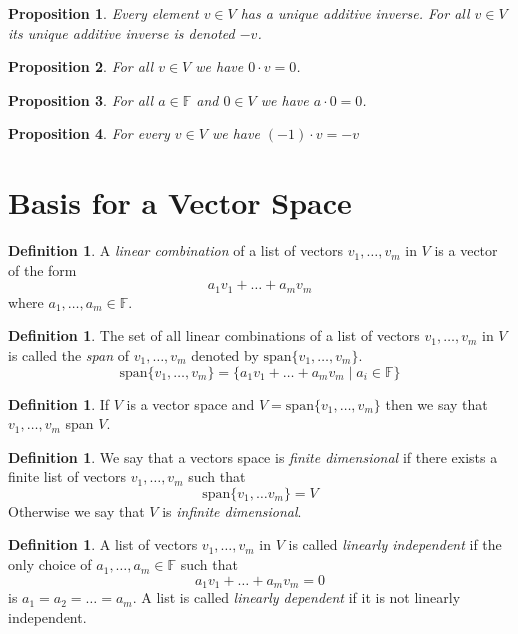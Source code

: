 \documentclass[12pt,letterpaper]{amsart}
\theoremstyle{plain}
\newtheorem{proposition}{Proposition}[section]
\theoremstyle{definition}
\newtheorem{definition}[theorem]{Definition}
\numberwithin{equation}{section}
\begin{document}
\begin{proposition}Every element $v\in V$ has a unique additive inverse. For all $v\in V$ its unique additive inverse is denoted $-v$. 
\end{proposition}

\begin{proposition}For all $v\in V$ we have $0\cdot v=0$. 
\end{proposition}

\begin{proposition}For all $a\in \mathbb{F}$ and $0\in V$ we have $a\cdot 0=0$.
\end{proposition}

\begin{proposition}For every $v\in V$ we have $(-1)\cdot v=-v$
\end{proposition}
\newpage
\section{Basis for a Vector Space}

\begin{definition} A \emph{linear combination} of a list of vectors $v_1,\ldots, v_m$ in $V$ is a vector of the form 
\[a_1v_1+\ldots+a_mv_m\]
where $a_1,\ldots, a_m\in \mathbb{F}$. 
\end{definition}

\begin{definition} The set of all linear combinations of a list of vectors $v_1, \ldots, v_m$ in $V$ is called the \emph{span} of $v_1, \ldots,v_m$ denoted by 
$\text{span}\{v_1,\ldots,v_m\}$.
\[\text{span}\{v_1,\ldots,v_m\}=\{a_1v_1+\ldots+a_mv_m\mid a_i\in \mathbb{F}\}\]
\end{definition}

\begin{definition} If $V$ is a vector space and $V=\text{span}\{v_1,\ldots,v_m\}$ then we say that $v_1, \ldots, v_m$ span $V$. 
\end{definition}

\begin{definition} We say that a vectors space is \emph{finite dimensional} if there exists a finite list of vectors $v_1,\ldots, v_m$ such that 
\[\text{span}\{v_1,\ldots v_m\}=V\] 
Otherwise we say that $V$ is \emph{infinite dimensional}.
\end{definition}


\begin{definition} A list of vectors $v_1,\ldots, v_m$ in $V$ is called \emph{linearly independent} if the only choice of $a_1, \ldots, a_m\in \mathbb{F}$ such that 
\[a_1v_1+\ldots+a_mv_m=0\] is $a_1=a_2=\ldots =a_m$. A list is called \emph{linearly dependent} if it is not linearly independent.
\end{definition}
\end{document}
